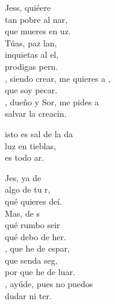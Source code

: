 \begin{cancion}%
	Jess, quiéere\\
	tan pobre al nar,\\
	que mueres en uz.\\
	Túas, paz  lan,\\
	inquietas al el,\\
	prodigas pern.\\
	, siendo crear, me quieres a ,\\
	que soy pecar.\\
	, dueño y Sor, me pides a\\
	salvar la creacin.\jump\\
	\begin{chorus}%
		isto es sal de la da\\
		luz en tieblas,\\
		es todo ar.\jump\\
	\end{chorus}%
	Jes, ya  de\\
	algo de tu r,\\
	qué quieres deí.\\
	Mas,  de s \\
	qué rumbo seir\\
	qué debo de her.\\
	, que he de espar,\\
	que senda seg,\\
	por que he de luar.\\
	, ayúde, pues no puedos\\
	dudar ni ter.\\
	\jump
\end{cancion}%
